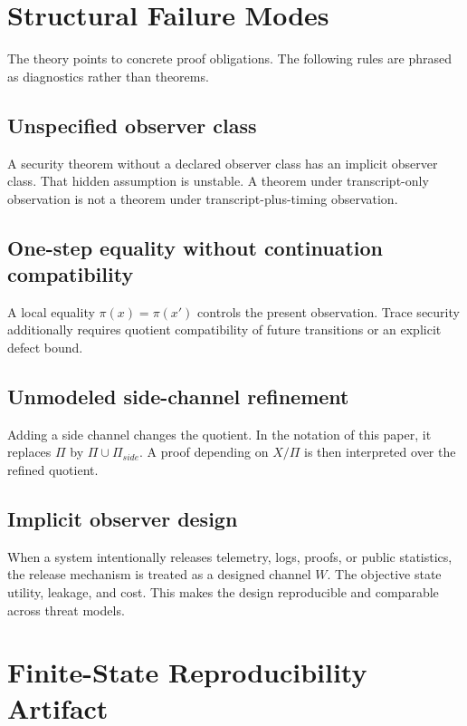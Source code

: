 \documentclass[11pt]{article}
\theoremstyle{definition}
\theoremstyle{plain}
\theoremstyle{remark}
\begin{document}
\section{Structural Failure Modes}

The theory points to concrete proof obligations. The following rules are phrased as diagnostics rather than theorems.

\subsection{Unspecified observer class}

A security theorem without a declared observer class has an implicit observer class. That hidden assumption is unstable. A theorem under transcript-only observation is not a theorem under transcript-plus-timing observation.

\subsection{One-step equality without continuation compatibility}

A local equality $\pi(x)=\pi(x')$ controls the present observation. Trace security additionally requires quotient compatibility of future transitions or an explicit defect bound.

\subsection{Unmodeled side-channel refinement}

Adding a side channel changes the quotient. In the notation of this paper, it replaces $\Pi$ by $\Pi\cup\Pi_{side}$. A proof depending on $X/\Pi$ is then interpreted over the refined quotient.

\subsection{Implicit observer design}

When a system intentionally releases telemetry, logs, proofs, or public statistics, the release mechanism is treated as a designed channel $W$. The objective state utility, leakage, and cost. This makes the design reproducible and comparable across threat models.



\section{Finite-State Reproducibility Artifact}
\end{document}
